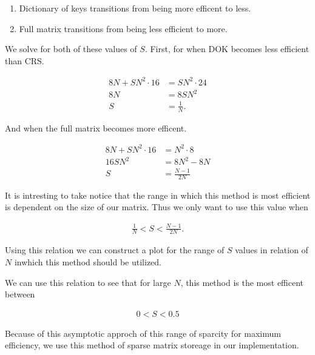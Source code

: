 \documentclass[../fem.tex]{subfiles}
\begin{document}
\begin{enumerate}[label=\arabic*.]
  \item Dictionary of keys transitions from being more efficent to less.
  \item Full matrix transitions from being less efficient to more.
\end{enumerate}

We solve for both of these values of $S$. First, for when DOK becomes less
efficient than CRS.

\begin{align*}
  8N+SN^2\cdot16&=SN^2\cdot24\\
  8N&=8SN^2\\
  S&=\frac{1}{N}.
\end{align*}

And when the full matrix becomes more efficent.

\begin{align*}
  8N+SN^2\cdot16&=N^2\cdot8\\
  16SN^2&=8N^2-8N\\
  S&=\frac{N-1}{2N}
\end{align*}

It is intresting to take notice that the range in which this method is most
efficient is dependent on the size of our matrix. Thus we only want to use this
value when

\begin{align*}
  \frac{1}{N}<S<\frac{N-1}{2N}.
\end{align*}

Using this relation we can construct a plot for the range of $S$ values in
relation of $N$ inwhich this method should be utilized.


We can use this relation to see that for large $N$, this method is the most
efficent between

\begin{align*}
   0 < S < 0.5
\end{align*}

Because of this asymptotic approch of this range of sparcity for maximum
efficiency, we use this method of sparse matrix storeage in our implementation.

\begin{Figure}
  \begin{center}
  \end{center}
  \label{fig:mat_CRS}
\end{Figure}
\end{document}
